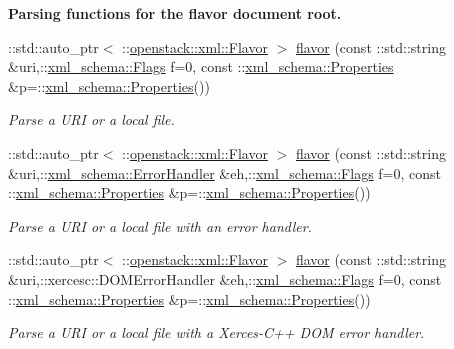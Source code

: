 \begin{Indent}{\bf Parsing functions for the flavor document root.}\par
\begin{DoxyCompactItemize}
\item 
::std::auto\_\-ptr$<$ ::\hyperlink{classopenstack_1_1xml_1_1Flavor}{openstack::xml::Flavor} $>$ \hyperlink{namespaceopenstack_1_1xml_a331b7025b04331eeca1f7b2b23b00b79}{flavor} (const ::std::string \&uri,::\hyperlink{namespacexml__schema_affb4c227cbd9aa7453dd1dc5a1401943}{xml\_\-schema::Flags} f=0, const ::\hyperlink{namespacexml__schema_ad27ce19a7ee1d3b1064092648898f64c}{xml\_\-schema::Properties} \&p=::\hyperlink{namespacexml__schema_ad27ce19a7ee1d3b1064092648898f64c}{xml\_\-schema::Properties}())
\begin{DoxyCompactList}\small\item\em Parse a URI or a local file. \item\end{DoxyCompactList}\item 
::std::auto\_\-ptr$<$ ::\hyperlink{classopenstack_1_1xml_1_1Flavor}{openstack::xml::Flavor} $>$ \hyperlink{namespaceopenstack_1_1xml_a9d8f29305bc1ff45132d8b96cf7b15dd}{flavor} (const ::std::string \&uri,::\hyperlink{namespacexml__schema_ab1c9361bfd3b404eaabf0c31eded79dc}{xml\_\-schema::ErrorHandler} \&eh,::\hyperlink{namespacexml__schema_affb4c227cbd9aa7453dd1dc5a1401943}{xml\_\-schema::Flags} f=0, const ::\hyperlink{namespacexml__schema_ad27ce19a7ee1d3b1064092648898f64c}{xml\_\-schema::Properties} \&p=::\hyperlink{namespacexml__schema_ad27ce19a7ee1d3b1064092648898f64c}{xml\_\-schema::Properties}())
\begin{DoxyCompactList}\small\item\em Parse a URI or a local file with an error handler. \item\end{DoxyCompactList}\item 
::std::auto\_\-ptr$<$ ::\hyperlink{classopenstack_1_1xml_1_1Flavor}{openstack::xml::Flavor} $>$ \hyperlink{namespaceopenstack_1_1xml_a2e2a811b707c71dff990648f6e1e3732}{flavor} (const ::std::string \&uri,::xercesc::DOMErrorHandler \&eh,::\hyperlink{namespacexml__schema_affb4c227cbd9aa7453dd1dc5a1401943}{xml\_\-schema::Flags} f=0, const ::\hyperlink{namespacexml__schema_ad27ce19a7ee1d3b1064092648898f64c}{xml\_\-schema::Properties} \&p=::\hyperlink{namespacexml__schema_ad27ce19a7ee1d3b1064092648898f64c}{xml\_\-schema::Properties}())
\begin{DoxyCompactList}\small\item\em Parse a URI or a local file with a Xerces-\/C++ DOM error handler. \item\end{DoxyCompactList}\item 

\end{DoxyCompactItemize}
\end{Indent}
